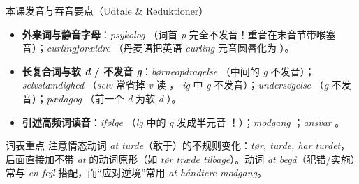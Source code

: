 \begin{tipbox}{本课发音与吞音要点（Udtale \& Reduktioner）}
\begin{itemize}
  \item \textbf{外来词与静音字母}：\textit{psykolog} （词首 \textit{p} 完全不发音！重音在末音节带喉塞音）；\textit{curlingforældre} （丹麦语把英语 \textit{curling} 元音圆唇化为 ）。
  \item \textbf{长复合词与软 \textit{d} / 不发音 \textit{g}}：\textit{børneopdragelse} （中间的 \textit{g} 不发音）；\textit{selvstændighed} （\textit{selv} 常省掉 \textit{v} 读 ，\textit{-ig} 中 \textit{g} 不发音）；\textit{undersøgelse} （\textit{g} 不发音）；\textit{pædagog} （前一个 \textit{d} 为软 \textit{d} ）。
  \item \textbf{引述高频词读音}：\textit{ifølge} （\textit{lg} 中的 \textit{g} 发成半元音 ！）；\textit{modgang} ；\textit{ansvar} 。
\end{itemize}
\end{tipbox}


\begin{tipbox}{词表重点}
注意情态动词 \textit{at turde}（敢于）的不规则变化：\textit{tør, turde, har turdet}，后面直接加不带 \textit{at} 的动词原形（如 \textit{tør træde tilbage}）。动词 \textit{at begå}（犯错/实施）常与 \textit{en fejl} 搭配，而“应对逆境”常用 \textit{at håndtere modgang}。
\end{tipbox}

